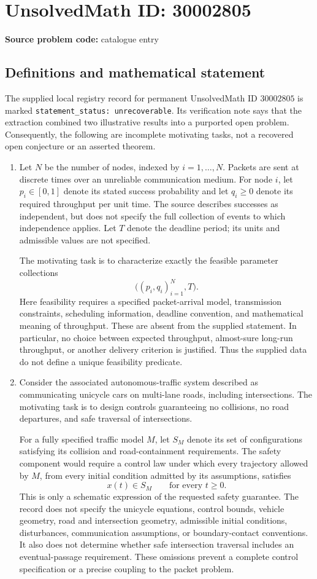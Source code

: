 \documentclass[11pt]{article}
\begin{document}
\section*{UnsolvedMath ID: 30002805}
\textbf{Source problem code:} catalogue entry
\subsection{Definitions and mathematical statement}
The supplied local registry record for permanent UnsolvedMath ID \(30002805\) is marked \texttt{statement\_status: unrecoverable}. Its verification note says that the extraction combined two illustrative results into a purported open problem. Consequently, the following are incomplete motivating tasks, not a recovered open conjecture or an asserted theorem.

\begin{enumerate}
\item Let \(N\) be the number of nodes, indexed by \(i=1,\ldots,N\). Packets are sent at discrete times over an unreliable communication medium. For node \(i\), let \(p_i\in[0,1]\) denote its stated success probability and let \(q_i\geq0\) denote its required throughput per unit time. The source describes successes as independent, but does not specify the full collection of events to which independence applies. Let \(T\) denote the deadline period; its units and admissible values are not specified.

The motivating task is to characterize exactly the feasible parameter collections
\[
\bigl((p_i,q_i)_{i=1}^{N},T\bigr).
\]
Here feasibility requires a specified packet-arrival model, transmission constraints, scheduling information, deadline convention, and mathematical meaning of throughput. These are absent from the supplied statement. In particular, no choice between expected throughput, almost-sure long-run throughput, or another delivery criterion is justified. Thus the supplied data do not define a unique feasibility predicate.

\item Consider the associated autonomous-traffic system described as communicating unicycle cars on multi-lane roads, including intersections. The motivating task is to design controls guaranteeing no collisions, no road departures, and safe traversal of intersections.

For a fully specified traffic model \(M\), let \(S_M\) denote its set of configurations satisfying its collision and road-containment requirements. The safety component would require a control law under which every trajectory allowed by \(M\), from every initial condition admitted by its assumptions, satisfies
\[
x(t)\in S_M\qquad\text{for every }t\geq0.
\]
This is only a schematic expression of the requested safety guarantee. The record does not specify the unicycle equations, control bounds, vehicle geometry, road and intersection geometry, admissible initial conditions, disturbances, communication assumptions, or boundary-contact conventions. It also does not determine whether safe intersection traversal includes an eventual-passage requirement. These omissions prevent a complete control specification or a precise coupling to the packet problem.
\end{enumerate}
\end{document}
